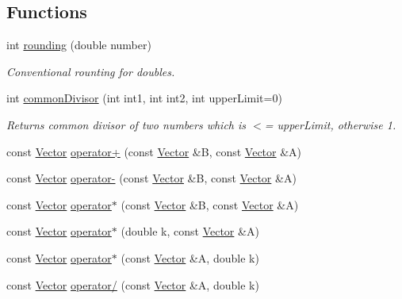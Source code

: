 \subsection*{Functions}
\begin{DoxyCompactItemize}
\item 
int \hyperlink{namespace_p_c_a_acd05fa0d440ac1781a76499f3cdb3f38}{rounding} (double number)
\begin{DoxyCompactList}\small\item\em Conventional rounting for doubles. \end{DoxyCompactList}\item 
int \hyperlink{namespace_p_c_a_a13d2c7cbde32faf05da77e81c6396b92}{common\+Divisor} (int int1, int int2, int upper\+Limit=0)
\begin{DoxyCompactList}\small\item\em Returns common divisor of two numbers which is $<$= upper\+Limit, otherwise 1. \end{DoxyCompactList}\item 
const \hyperlink{class_p_c_a_1_1_vector}{Vector} \hyperlink{namespace_p_c_a_a017b6648f950fd5e297bc92225a425dc}{operator+} (const \hyperlink{class_p_c_a_1_1_vector}{Vector} \&B, const \hyperlink{class_p_c_a_1_1_vector}{Vector} \&A)
\item 
const \hyperlink{class_p_c_a_1_1_vector}{Vector} \hyperlink{namespace_p_c_a_a430437e74079b33bcf7a99ef38c01134}{operator-\/} (const \hyperlink{class_p_c_a_1_1_vector}{Vector} \&B, const \hyperlink{class_p_c_a_1_1_vector}{Vector} \&A)
\item 
const \hyperlink{class_p_c_a_1_1_vector}{Vector} \hyperlink{namespace_p_c_a_a49f60e2a8814942d40f8df470c723214}{operator$\ast$} (const \hyperlink{class_p_c_a_1_1_vector}{Vector} \&B, const \hyperlink{class_p_c_a_1_1_vector}{Vector} \&A)
\item 
const \hyperlink{class_p_c_a_1_1_vector}{Vector} \hyperlink{namespace_p_c_a_a6f1801f8e53ab87a1f3175ec18fa3115}{operator$\ast$} (double k, const \hyperlink{class_p_c_a_1_1_vector}{Vector} \&A)
\item 
const \hyperlink{class_p_c_a_1_1_vector}{Vector} \hyperlink{namespace_p_c_a_a58012056e60671ce13c8318b3cd1ec8f}{operator$\ast$} (const \hyperlink{class_p_c_a_1_1_vector}{Vector} \&A, double k)
\item 
const \hyperlink{class_p_c_a_1_1_vector}{Vector} \hyperlink{namespace_p_c_a_a5144cc8f2a3d8ab924e8c4c1c32a2aed}{operator/} (const \hyperlink{class_p_c_a_1_1_vector}{Vector} \&A, double k)
\item 

\end{DoxyCompactItemize}
